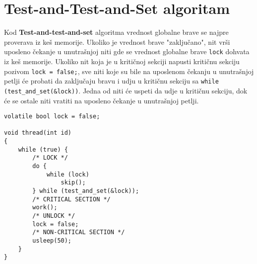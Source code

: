 \clearpage
\section{Test-and-Test-and-Set algoritam}
Kod \textbf{Test-and-test-and-set} algoritma vrednost globalne brave se najpre proverava iz ke\v{s} memorije. Ukoliko je vrednost brave "zaklju\v{c}ano", nit vr\v{s}i uposleno \v{c}ekanje u unutra\v{s}njoj niti gde se vrednost globalne brave \texttt{lock} dohvata iz ke\v{s} memorije. Ukoliko nit koja je u kriti\v{c}noj sekciji napusti kriti\v{c}nu sekciju pozivom \texttt{lock = false;}, sve niti koje su bile na uposlenom \v{c}ekanju u unutra\v{s}njoj petlji \'{c}e probati da zaklju\v{c}aju bravu i udju u kriti\v{c}nu sekciju sa  \texttt{while (test\_and\_set(\&lock))}. Jedna od niti \'{c}e uspeti da udje u kriti\v{c}nu sekciju, dok \'{c}e se ostale niti vratiti na uposleno \v{c}ekanje u unutra\v{s}njoj petlji.
\begin{lstlisting}
volatile bool lock = false;

void thread(int id)
{
    while (true) {
		/* LOCK */
        do {
			while (lock)
				skip();
		} while (test_and_set(&lock));
		/* CRITICAL SECTION */
		work();
		/* UNLOCK */
		lock = false;
		/* NON-CRITICAL SECTION */
        usleep(50);
    }
}
\end{lstlisting}